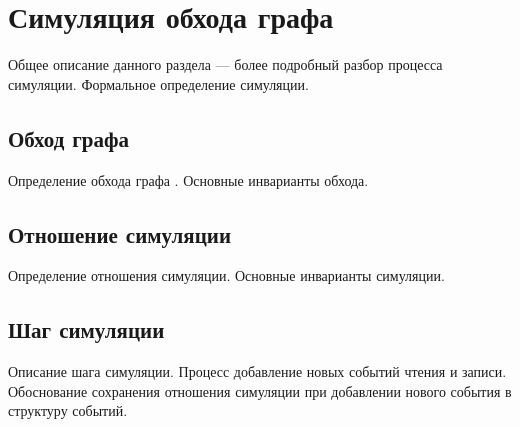 \pagebreak

\section{Симуляция обхода графа \IMM}

Общее описание данного раздела --- более подробный разбор процесса симуляции.
Формальное определение симуляции.

\subsection{Обход графа \IMM}

Определение обхода графа \IMM. Основные инварианты обхода.

\subsection{Отношение симуляции}

Определение отношения симуляции. Основные инварианты симуляции.

\subsection{Шаг симуляции}

Описание шага симуляции. Процесс добавление новых событий чтения и записи.
Обоснование сохранения отношения симуляции при добавлении
нового события в структуру событий.


